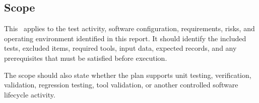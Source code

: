 \subsection{Scope}
This \stdTestPlan\ applies to the test activity, software configuration,
requirements, risks, and operating environment identified in this report.  It
should identify the included tests, excluded items, required tools, input data,
expected records, and any prerequisites that must be satisfied before execution.

\tlcVspace

The scope should also state whether the plan supports unit testing,
verification, validation, regression testing, tool validation, or another
controlled software lifecycle activity.

